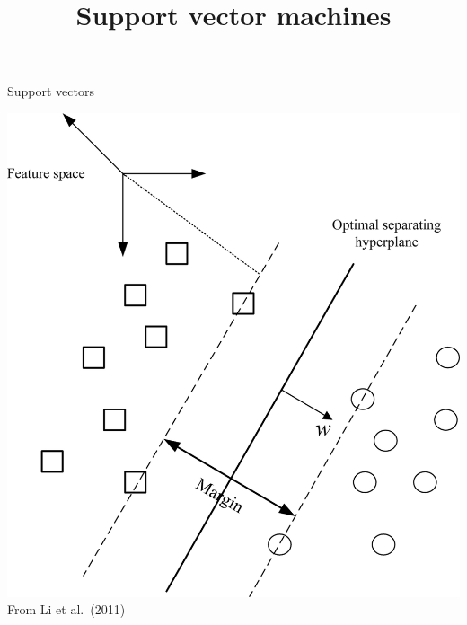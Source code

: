 

\title{Support vector machines}



\maketitle

\begin{frame}{Support vectors}
    \begin{center}
        \includegraphics[height=0.8\textheight]{figures/support_vectors} \\
        {\scriptsize%
         From Li et al.\ (2011)}
    \end{center}
\end{frame}


